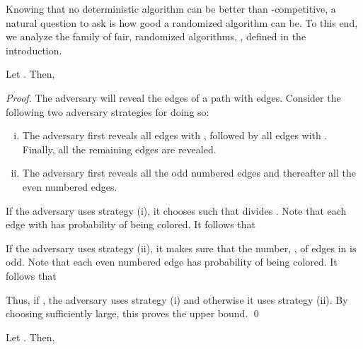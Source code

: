 \documentclass[smallextended]{svjour3}
\begin{document}
Knowing that no deterministic algorithm can be better than
 -competitive, a natural question to ask is how good a
 randomized algorithm can be. 
To this end, we analyze the family of fair, randomized
 algorithms, , defined in the introduction.

\begin{lemma}
\label{rpupper}
Let . Then,

\end{lemma}

\begin{proof}
The adversary will reveal the edges of a path  with  edges. Consider the following two adversary strategies for doing so:
\begin{enumerate}[(i)]
\item The adversary first reveals all edges  with , followed by all edges  with . Finally, all the remaining edges are revealed.

\item The adversary first reveals all the odd numbered edges and thereafter all the even numbered edges.
\end{enumerate}

If the adversary uses strategy (i), it chooses  such that  divides . Note that each edge  with  has probability  of being colored. It follows that 

If the adversary uses strategy (ii), it makes sure that the number, , of edges in  is odd. Note that each even numbered edge has probability  of being colored. It follows that 



Thus, if , the adversary uses strategy (i) and otherwise it uses strategy (ii). By choosing  sufficiently large, this proves the upper bound.
\qed\end{proof}

\begin{lemma}
\label{rplower}
Let . Then,

\end{lemma}
\end{document}
